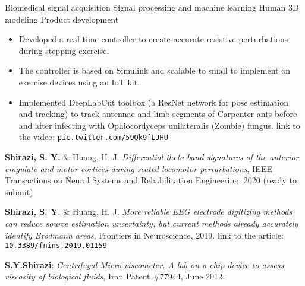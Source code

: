 \begin{outline}
    \1 Biomedical signal acquisition
    \1 Signal processing and machine learning
    \1 Human 3D modeling
    \1 Product development
    
\end{outline}

\begin{itemize}
\item Developed a real-time controller to create accurate resistive perturbations during stepping exercise.
\item The controller is based on Simulink and scalable to small to implement on exercise devices using an IoT kit.
\end{itemize}
\smallskip
{}
\begin{itemize}
\item Implemented DeepLabCut toolbox (a ResNet network for pose estimation and tracking) to track antennae and limb segments of Carpenter ants before and after infecting with Ophiocordyceps unilateralis (Zombie) fungus. {\footnotesize{link to the video:} {\tt{\href{https://pic.twitter.com/59Qk9fLJHU}{pic.twitter.com/59Qk9fLJHU}}}}
\end{itemize}

\smallskip
\textbf{Shirazi, S. Y.} \& Huang, H. J. \textit{Differential theta-band signatures of the anterior cingulate and motor cortices during seated locomotor perturbations}, IEEE Transactions on Neural Systems and Rehabilitation Engineering, 2020 (ready to submit)
\smallskip
\vspace{1ex}

\textbf{Shirazi, S. Y.} \& Huang, H. J. \textit{More reliable EEG electrode digitizing methods can reduce source estimation uncertainty, but current methods already accurately identify Brodmann areas}, Frontiers in Neuroscience, 2019. {\footnotesize{link to the article:} {\tt{\href{https://www.frontiersin.org/articles/10.3389/fnins.2019.01159/}{10.3389/fnins.2019.01159}}}}

\textbf{S.Y.Shirazi}: \textit{Centrifugal Micro-viscometer. A lab-on-a-chip device to assess viscosity of biological fluids}, Iran Patent \#77944, June 2012.
